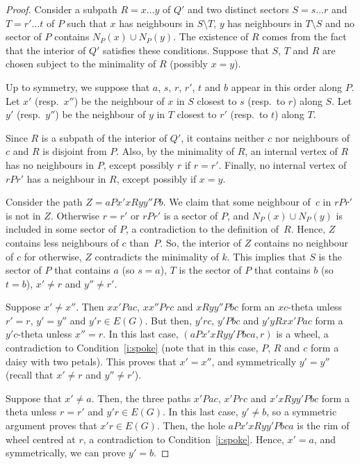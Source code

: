 \documentclass[10pt,a4paper]{amsart}
\newcommand{\sm}{\setminus}
\begin{document}
\begin{proof}
  Consider a subpath $R= x \dots y$ of $Q'$ and two distinct sectors $S = s\dots r$ and $T = r'\dots t$ of $P$ such that $x$ has neighbours in $S\sm T$, $y$ has neighbours in $T\sm S$ and no sector of $P$ contains $N_P(x) \cup N_P(y)$. 
  The existence of $R$ comes from the fact that the interior of $Q'$  satisfies these conditions.  
  Suppose that $S$, $T$ and $R$ are chosen subject to the minimality of $R$ (possibly $x=y$). 
  
  Up to symmetry, we suppose that $a$, $s$, $r$, $r'$, $t$ and $b$ appear in this order along $P$.  
  Let $x'$ (resp.\ $x''$) be the neighbour of $x$ in $S$ closest to $s$ (resp.\ to $r$) along $S$.  Let $y'$ (resp.\ $y''$) be the neighbour of $y$ in $T$ closest to $r'$ (resp.\ to $t$) along $T$. 
  
  Since $R$ is a subpath of the interior of $Q'$, it contains neither $c$ nor neighbours of $c$ and $R$ is disjoint from $P$.  Also, by the minimality of $R$, an internal vertex of $R$ has no neighbours in $P$, except possibly $r$ if $r=r'$.  Finally, no internal vertex of $r P r'$ has a neighbour in $R$,  except possibly if $x=y$.  
 
  Consider the path $Z = a P x' x R y y'' P b$.  
  We claim that some neighbour of~$c$  in $rPr'$ is not in $Z$.  
  Otherwise $r=r'$ or $rPr'$ is a sector of $P$, and $N_P(x) \cup N_P(y)$ is included in some sector of $P$, a contradiction to the definition of~$R$. 
  Hence, $Z$  contains less neighbours of $c$ than~$P$.  So, the interior of $Z$ contains no neighbour of $c$ for otherwise, $Z$ contradicts the minimality of $k$.  
  This implies that $S$ is the sector of $P$ that contains $a$ (so $s=a$), $T$ is the sector of $P$ that contains $b$ (so $t=b$), $x' \neq  r$ and $y'' \neq  r'$. 

  Suppose $x'\neq x''$.  
  Then $x x' P a c$, $x x'' P r c$ and $x R y y'' P b c$ form an $xc$-theta unless $r'=r$, $y'=y''$ and $y'r \in E(G)$.  
  But then, $y' r c$, $y' P b c$ and $y'y R x x' P a c$ form a $y'c$-theta unless $x''=r$. 
  In this last case, $(aPx'xRyy'Pbca, r)$ is a wheel, a contradiction to Condition~\ref{i:spoke} (note that in this case, $P$, $R$ and $c$ form a daisy with two petals). 
  This proves that $x'=x''$, and symmetrically $y'=y''$ (recall that $x' \neq  r$ and $y'' \neq  r'$).
  
  Suppose that $x'\neq a$.  
  Then, the three paths $x' P a c$, $x' P r c$ and $x' x R y y' P b c$ form a theta unless $r = r'$ and $y'r \in E(G)$.  In this last case, $y'\neq b$, so a symmetric argument proves that $x'r\in E(G)$.  
  Then, the hole $a P x' x R y y' P b c a$ is the rim of wheel centred at $r$, a contradiction to Condition~\ref{i:spoke}.  Hence, $x'=a$, and symmetrically, we can prove $y'=b$. 
  

\end{proof}
\end{document}
